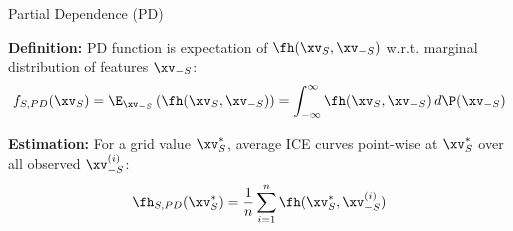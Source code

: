 \documentclass[11pt,compress,t,notes=noshow, aspectratio=169, xcolor=table]{beamer}
\begin{document}
\begin{frame}{Partial Dependence (PD) }

\textbf{Definition:} PD function is expectation of $\fh(\xv_S, \xv_{-S})$ w.r.t. marginal distribution of features $\xv_{-S}$:
$$f_{S, PD}(\xv_S) = \E_{\xv_{-S}} \left( \fh(\xv_S, \xv_{-S}) \right) = \int_{-\infty}^{\infty} \fh(\xv_S, \xv_{-S}) \, d\P(\xv_{-S})$$

\textbf{Estimation:} For a grid value $\xv_S^*$, average ICE curves point-wise at $\xv_S^*$ over all observed $\xv_{-S}^{(i)}$:
$$\fh_{S, PD}(\xv_S^*) = \frac{1}{n} \sum_{i=1}^n \fh(\xv_S^*, \xv_{-S}^{(i)})$$


\end{frame}







\end{document}
